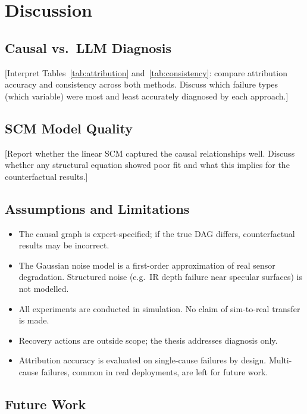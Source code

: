 \documentclass[journal]{IEEEtran}
\begin{document}
\section{Discussion}
\label{sec:discussion}

\subsection{Causal vs.\ LLM Diagnosis}

[Interpret Tables~\ref{tab:attribution} and~\ref{tab:consistency}:
compare attribution accuracy and consistency across both methods.
Discuss which failure types (which variable) were most and least
accurately diagnosed by each approach.]

\subsection{SCM Model Quality}

[Report whether the linear SCM captured the causal relationships
well.  Discuss whether any structural equation showed poor fit
and what this implies for the counterfactual results.]

\subsection{Assumptions and Limitations}

\begin{itemize}
  \item The causal graph is expert-specified; if the true DAG
        differs, counterfactual results may be incorrect.
  \item The Gaussian noise model is a first-order approximation
        of real sensor degradation.  Structured noise (e.g.\
        IR depth failure near specular surfaces) is not modelled.
  \item All experiments are conducted in simulation.  No claim
        of sim-to-real transfer is made.
  \item Recovery actions are outside scope; the thesis addresses
        diagnosis only.
  \item Attribution accuracy is evaluated on single-cause
        failures by design.  Multi-cause failures, common in
        real deployments, are left for future work.
\end{itemize}

\subsection{Future Work}
\end{document}
